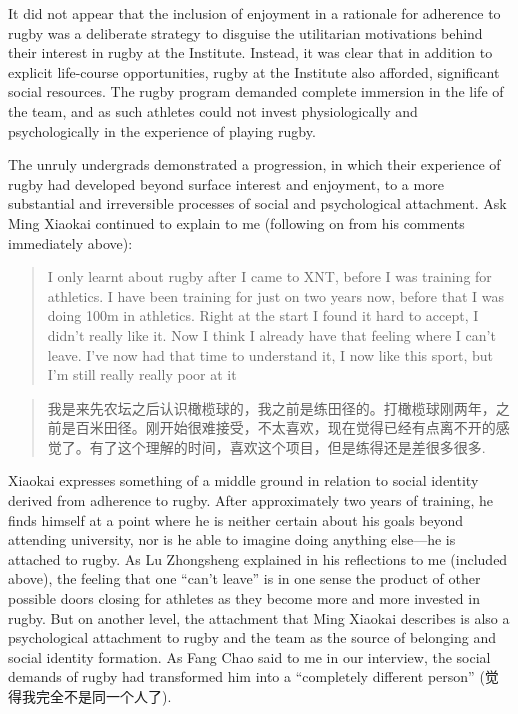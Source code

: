 \begin{CJK}{UTF8}{gbsn}
It did not appear that the inclusion of enjoyment in a rationale for adherence to rugby was a deliberate strategy to disguise the utilitarian motivations behind their interest in rugby at the Institute.  Instead, it was clear that in addition to explicit life-course opportunities, rugby at the Institute also afforded,  significant social resources.  The rugby program demanded complete immersion in the life of the team, and as such athletes could not invest physiologically and psychologically in the experience of playing rugby.


The unruly undergrads demonstrated a progression, in which their experience of rugby had developed beyond surface interest and enjoyment, to a more substantial and irreversible processes of social and psychological attachment.  Ask Ming Xiaokai continued to explain to me (following on from his comments immediately above):

\begin{quotation}
    I only learnt about rugby after I came to XNT, before I was training for athletics. I have been training for just on two years now, before that I was doing 100m in athletics.  Right at the start I found it hard to accept, I didn’t really like it. Now I think I already have that feeling where I can’t leave.  I’ve now had that time to understand it, I now like this sport, but I’m still really really poor at it
\end{quotation}

\begin{quotation}
    我是来先农坛之后认识橄榄球的，我之前是练田径的。打橄榄球刚两年，之前是百米田径。刚开始很难接受，不太喜欢，现在觉得已经有点离不开的感觉了。有了这个理解的时间，喜欢这个项目，但是练得还是差很多很多.
\end{quotation}

Xiaokai expresses something of a middle ground in relation to social identity derived from adherence to rugby.  After approximately two years of training, he finds himself at a point where he is neither certain about his goals beyond attending university, nor is he able to imagine doing anything else---he is attached to rugby.  As Lu Zhongsheng explained in his reflections to me (included above), the feeling that one ``can't leave'' is in one sense the product of other possible doors closing for athletes as they become more and more invested in rugby.  But on another level, the attachment that Ming Xiaokai describes is also a psychological attachment to rugby and the team as the source of belonging and social identity formation.   As Fang Chao said to me in our interview, the social demands of rugby had transformed him into a ``completely different person'' (觉得我完全不是同一个人了).


\end{CJK}
